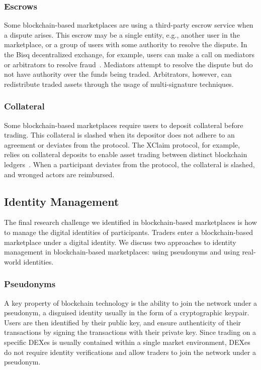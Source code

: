 \subsubsection{Escrows}
Some blockchain-based marketplaces are using a third-party escrow service when a dispute arises.
This escrow may be a single entity, e.g., another user in the marketplace, or a group of users with some authority to resolve the dispute.
In the Bisq decentralized exchange, for example, users can make a call on mediators or arbitrators to resolve fraud~\cite{bisq}.
Mediators attempt to resolve the dispute but do not have authority over the funds being traded.
Arbitrators, however, can redistribute traded assets through the usage of multi-signature techniques.

\subsubsection{Collateral}
Some blockchain-based marketplaces require users to deposit collateral before trading.
This collateral is slashed when its depositor does not adhere to an agreement or deviates from the protocol.
The XClaim protocol, for example, relies on collateral deposits to enable asset trading between distinct blockchain ledgers~\cite{zamyatin2019xclaim}.
When a participant deviates from the protocol, the collateral is slashed, and wronged actors are reimbursed.

\subsection{Identity Management}
The final research challenge we identified in blockchain-based marketplaces is how to manage the digital identities of participants.
Traders enter a blockchain-based marketplace under a digital identity.
We discuss two approaches to identity management in blockchain-based marketplaces: using pseudonyms and using real-world identities.

\subsubsection{Pseudonyms}
A key property of blockchain technology is the ability to join the network under a pseudonym, a disguised identity usually in the form of a cryptographic keypair.
Users are then identified by their public key, and ensure authenticity of their transactions by signing the transactions with their private key.
Since trading on a specific DEXes is usually contained within a single market environment, DEXes do not require identity verifications and allow traders to join the network under a pseudonym.

